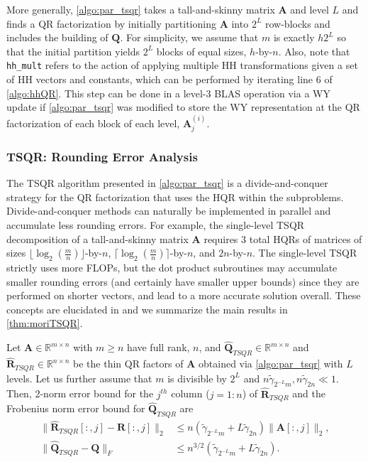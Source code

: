 \documentclass[review,onefignum,onetabnum]{siamart190516}
\newcommand{\R}{\mathbb{R}}
\newcommand{\bb}[1]{\mathbf{#1}}
\begin{document}
More generally, \cref{algo:par_tsqr} takes a tall-and-skinny matrix $\bb{A}$ and level $L$ and finds a QR factorization by initially partitioning $\bb{A}$ into $2^{L}$ row-blocks and includes the building of $\bb{Q}$.
For simplicity, we assume that $m$ is exactly $h2^{L}$ so that the initial partition yields $2^{L}$ blocks of equal sizes, $h$-by-$n$. 
Also, note that {\tt hh\_mult} refers to the action of applying multiple HH transformations given a set of HH vectors and constants, which can be performed by iterating line 6 of \cref{algo:hhQR}.
This step can be done in a level-3 BLAS operation via a WY update if \cref{algo:par_tsqr} was modified to store the WY representation at the QR factorization of each block of each level, $\bb{A}_j^{(i)}$. 

\subsubsection{TSQR: Rounding Error Analysis}
\label{sec:TSQRre}
The TSQR algorithm presented in \cref{algo:par_tsqr} is a divide-and-conquer strategy for the QR factorization that uses the HQR within the subproblems. 
Divide-and-conquer methods can naturally be implemented in parallel and accumulate less rounding errors.
For example, the single-level TSQR decomposition of a tall-and-skinny matrix $\bb{A}$ requires 3 total HQRs of matrices of sizes $\lfloor\log_{2}(\frac{m}{n})\rfloor$-by-$n$, $\lceil\log_{2}(\frac{m}{n})\rceil$-by-$n$, and $2n$-by-$n$.
The single-level TSQR strictly uses more FLOPs, but the dot product subroutines may accumulate smaller rounding errors (and certainly have smaller upper bounds) since they are performed on shorter vectors, and lead to a more accurate solution overall.
These concepts are elucidated in \cite{Mori2012} and we summarize the main results  in \cref{thm:moriTSQR}.

\begin{theorem}
	\label{thm:moriTSQR}
	Let $\bb{A}\in\R^{m\times n}$ with $m\geq n$ have full rank, $n$, and $\hat{\bb{Q}}_{TSQR}\in\R^{m\times n}$ and $\hat{\bb{R}}_{TSQR}\in\R^{n\times n}$ be the thin QR factors of $\bb{A}$ obtained via \cref{algo:par_tsqr} with $L$ levels. 
	Let us further assume that $m$ is divisible by $2^L$ and $n\tilde{\gamma}_{2^{-L}m}, n\tilde{\gamma}_{ 2n} \ll 1$.
	Then, 2-norm error bound for the $j^{th}$ column ($j=1:n$) of $\hat{\bb{R}}_{TSQR}$ and the Frobenius norm error bound for $\hat{\bb{Q}}_{TSQR}$ are
	\begin{align}
	\|\hat{\bb{R}}_{TSQR}[:,j]-\bb{R}[:,j]\|_2 &\leq n(\tilde{\gamma}_{2^{-L}m} + L\tilde{\gamma}_{ 2n})\|\bb{A}[:,j]\|_2,  \label{eqn:tsqrRA}\\
	\|\hat{\bb{Q}}_{TSQR}-\bb{Q}\|_F &\leq n^{3/2}(\tilde{\gamma}_{2^{-L}m} + L\tilde{\gamma}_{ 2n}).\label{eqn:tsqrQ}
	\end{align}
\end{theorem}
\end{document}
